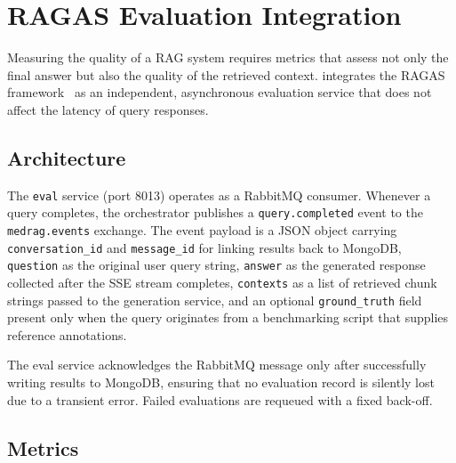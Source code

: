 \section{RAGAS Evaluation Integration}
\label{sec:ragas_integration}

Measuring the quality of a RAG system requires metrics that assess not only
the final answer but also the quality of the retrieved context.  \medrag{}
integrates the RAGAS framework~\cite{es2023ragas} as an independent, asynchronous
evaluation service that does not affect the latency of query responses.

\subsection{Architecture}

The \texttt{eval} service (port 8013) operates as a RabbitMQ consumer.
Whenever a query completes, the orchestrator publishes a
\texttt{query.completed} event to the \texttt{medrag.events} exchange.  The
event payload is a JSON object carrying \texttt{conversation\_id} and
\texttt{message\_id} for linking results back to MongoDB, \texttt{question} as the
original user query string, \texttt{answer} as the generated response collected after
the SSE stream completes, \texttt{contexts} as a list of retrieved chunk strings passed
to the generation service, and an optional \texttt{ground\_truth} field present only
when the query originates from a benchmarking script that supplies reference annotations.

The eval service acknowledges the RabbitMQ message only after successfully
writing results to MongoDB, ensuring that no evaluation record is silently
lost due to a transient error.  Failed evaluations are requeued with a fixed
back-off.

\subsection{Metrics}

